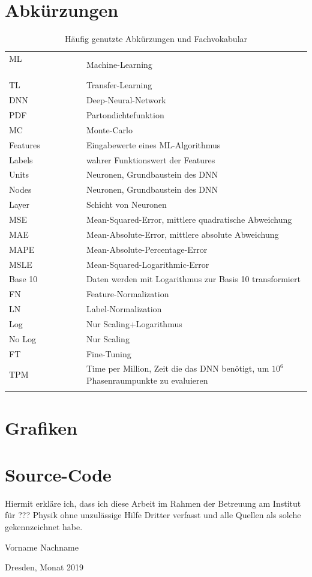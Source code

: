 \section{Abkürzungen}
\begin{table}[htp]
	\centering
	\begin{tabular}{ll}
		ML $\hspace{3cm}$& Machine-Learning \\
		TL & Transfer-Learning \\
		DNN & Deep-Neural-Network \\
		PDF & Partondichtefunktion \\
		MC & Monte-Carlo \\
		Features & Eingabewerte eines ML-Algorithmus \\
		Labels & wahrer Funktionswert der Features \\
		Units & Neuronen, Grundbaustein des DNN \\
		Nodes & Neuronen, Grundbaustein des DNN \\
		Layer & Schicht von Neuronen \\
		MSE & Mean-Squared-Error, mittlere quadratische Abweichung \\
		MAE & Mean-Absolute-Error, mittlere absolute Abweichung \\
		MAPE & Mean-Absolute-Percentage-Error\\
		MSLE & Mean-Squared-Logarithmic-Error \\
		Base 10& Daten werden mit Logarithmus zur Basis 10 transformiert \\
		FN & Feature-Normalization \\
		LN & Label-Normalization \\
		Log & Nur Scaling+Logarithmus \\
		No Log & Nur Scaling\\
		FT & Fine-Tuning \\
		TPM & Time per Million, Zeit die das DNN benötigt, um $10^6$ Phasenraumpunkte zu evaluieren \\
		&\\
	\end{tabular}
	\caption{Häufig genutzte Abkürzungen und Fachvokabular}
\end{table}

\section{Grafiken}
\section{Source-Code}
\clearpage
\thispagestyle{empty}
\vspace*{1.5em}

Hiermit erkläre ich, dass ich diese Arbeit im Rahmen der Betreuung am Institut
für ??? Physik ohne unzulässige Hilfe Dritter verfasst und alle Quellen als solche gekennzeichnet habe.

\vspace*{45em}

Vorname Nachname \par
Dresden, Monat 2019


